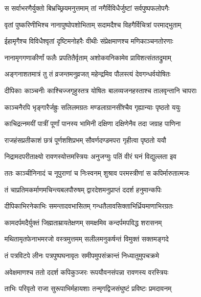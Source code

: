 \twolineshloka
{स सर्वाभरणैर्युक्तो बिभ्रच्छ्रियमनुत्तमाम्}
{तां नगैर्विविधैर्जुष्टां सर्वपुष्पफलोपगैः} %

\twolineshloka
{वृतां पुष्करिणीभिश्च नानापुष्पोपशोभिताम्}
{सदामदैश्च विहगैर्विचित्रां परमाद्भुताम्} %

\twolineshloka
{ईहामृगैश्च विविधैश्वृतां दृष्टिमनोहरैः}
{वीथीः संप्रेक्षमाणश्च मणिकाञ्चनतोरणाः} %

\twolineshloka
{नानामृगगणाकीर्णां फलैः प्रपतितैर्वृताम्}
{अशोकवनिकामेव प्राविशत्संततद्रुमाम्} %

\twolineshloka
{अङ्गनाशतमात्रं तु तं व्रजन्तमनुव्रजत्}
{महेन्द्रमिव पौलस्त्यं देवगन्धर्वयोषितः} %

\twolineshloka
{दीपिकाः काञ्चनीः काश्चिज्जगृहुस्तत्र योषितः}
{बालव्यजनहस्ताश्च तालवृन्तानि चापराः} %

\twolineshloka
{काञ्चनैरपि भृङ्गारैर्जह्रुः सलिलमग्रतः}
{मण्डलाग्रानसींश्चैव गृह्यान्याः पृष्ठतो ययुः} %

\twolineshloka
{काचिद्रत्नमयीं पात्रीं पूर्णां पानस्य भामिनी}
{दक्षिणा दक्षिणेनैव तदा जग्राह पाणिना} %

\twolineshloka
{राजहंसप्रतीकाशं छत्रं पूर्णशशिप्रभम्}
{सौवर्णदण्डमपरा गृहीत्वा पृष्ठतो ययौ} %

\twolineshloka
{निद्रामदपरीताक्ष्यो रावणस्योत्तमस्त्रियः}
{अनुजग्मुः पतिं वीरं घनं विद्युल्लता इव} %

\twolineshloka
{ततः काञ्चीनिनादं च नूपुराणां च निःस्वनम्}
{शुश्राव परमस्त्रीणां स कपिर्मारुतात्मजः} %

\twolineshloka
{तं चाप्रतिमकर्माणमचिन्त्यबलपौरुषम्}
{द्वारदेशमनुप्राप्तं ददर्श हनुमान्कपिः} %

\twolineshloka
{दीपिकाभिरनेकाभिः समन्तादवभासितम्}
{गन्धतैलावसिक्ताभिर्ध्रियमाणाभिरग्रतः} %

\twolineshloka
{कामदर्पमदैर्युक्तं जिह्मताम्रायतेक्षणम्}
{समक्षमिव कन्दर्पमपविद्ध शरासनम्} %

\twolineshloka
{मथितामृतफेनाभमरजो वस्त्रमुत्तमम्}
{सलीलमनुकर्षन्तं विमुक्तं सक्तमङ्गदे} %

\twolineshloka
{तं पत्रविटपे लीनः पत्रपुष्पघनावृतः}
{समीपमुपसंक्रान्तं निध्यातुमुपचक्रमे} %

\twolineshloka
{अवेक्षमाणश्च ततो ददर्श कपिकुञ्जरः}
{रूपयौवनसंपन्ना रावणस्य वरस्त्रियः} %

\twolineshloka
{ताभिः परिवृतो राजा सुरूपाभिर्महायशाः}
{तन्मृगद्विजसंघुष्टं प्रविष्टः प्रमदावनम्} %

